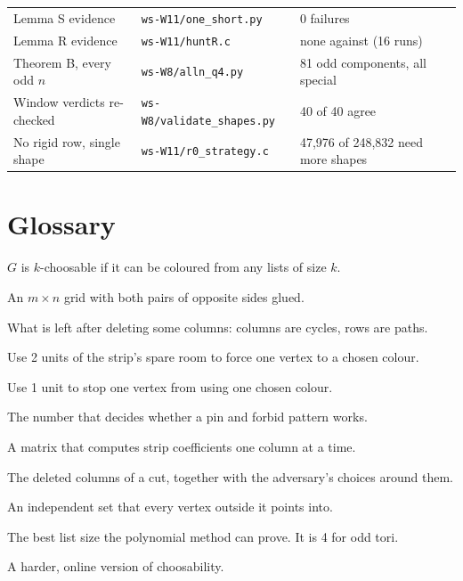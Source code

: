 \documentclass[11pt,oneside,openany]{book}
\newcommand{\T}{\mathbin{\square}}
\begin{document}
\begin{center}
\begin{tabular}{p{5.6cm}p{4.6cm}p{3.6cm}}
Lemma S evidence & \texttt{ws-W11/one\_short.py} & 0 failures \\
Lemma R evidence & \texttt{ws-W11/huntR.c} & none against (16 runs) \\
Theorem B, every odd $n$ & \texttt{ws-W8/alln\_q4.py} & 81 odd components, all special \\
Window verdicts re-checked & \texttt{ws-W8/validate\_shapes.py} & 40 of 40 agree \\
No rigid row, single shape & \texttt{ws-W11/r0\_strategy.c} & 47,976 of 248,832 need more shapes \\
\bottomrule
\end{tabular}
\end{center}

\chapter{Glossary}

\begin{description}[itemsep=0.3em]
\item[Choosable] $G$ is $k$-choosable if it can be coloured from any lists of size $k$.
\item[Torus grid $C_m \T C_n$] An $m \times n$ grid with both pairs of opposite sides glued.
\item[Strip] What is left after deleting some columns: columns are cycles, rows are paths.
\item[Pin] Use 2 units of the strip's spare room to force one vertex to a chosen colour.
\item[Forbid] Use 1 unit to stop one vertex from using one chosen colour.
\item[Strip coefficient] The number that decides whether a pin and forbid pattern works.
\item[Transfer matrix] A matrix that computes strip coefficients one column at a time.
\item[Window] The deleted columns of a cut, together with the adversary's choices around them.
\item[Kernel] An independent set that every vertex outside it points into.
\item[Alon--Tarsi number] The best list size the polynomial method can prove. It is 4 for odd tori.
\item[Paintability] A harder, online version of choosability.
\end{description}
\end{document}
